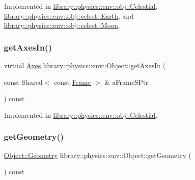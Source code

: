 Implemented in \hyperlink{classlibrary_1_1physics_1_1env_1_1obj_1_1_celestial_aaf8aa41a0ff9336eba62c07e3c27f82d}{library\+::physics\+::env\+::obj\+::\+Celestial}, \hyperlink{classlibrary_1_1physics_1_1env_1_1obj_1_1celest_1_1_earth_aca39bec00a2046a3fcef9bf22be52428}{library\+::physics\+::env\+::obj\+::celest\+::\+Earth}, and \hyperlink{classlibrary_1_1physics_1_1env_1_1obj_1_1celest_1_1_moon_a9d922ab338809a6c1052edbe11ce3e60}{library\+::physics\+::env\+::obj\+::celest\+::\+Moon}.

\mbox{\label{classlibrary_1_1physics_1_1env_1_1_object_a6807199a92fd78c10c6327b9ca654f50}} 
\subsubsection{\texorpdfstring{get\+Axes\+In()}{getAxesIn()}}
{\footnotesize\ttfamily virtual \hyperlink{classlibrary_1_1physics_1_1coord_1_1_axes}{Axes} library\+::physics\+::env\+::\+Object\+::get\+Axes\+In (\begin{DoxyParamCaption}\item[{const Shared$<$ const \hyperlink{classlibrary_1_1physics_1_1coord_1_1_frame}{Frame} $>$ \&}]{a\+Frame\+S\+Ptr }\end{DoxyParamCaption}) const\hspace{0.3cm}{\ttfamily [pure virtual]}}



Implemented in \hyperlink{classlibrary_1_1physics_1_1env_1_1obj_1_1_celestial_a51d7ed3c0dcf627fbbcd81f9b190fb6b}{library\+::physics\+::env\+::obj\+::\+Celestial}.

\mbox{\label{classlibrary_1_1physics_1_1env_1_1_object_a504f76c6e6da18b531972e6f26329255}} 
\subsubsection{\texorpdfstring{get\+Geometry()}{getGeometry()}}
{\footnotesize\ttfamily \hyperlink{classlibrary_1_1physics_1_1env_1_1_object_abdf50733c7ad97327fb64edca5670f13}{Object\+::\+Geometry} library\+::physics\+::env\+::\+Object\+::get\+Geometry (\begin{DoxyParamCaption}{ }\end{DoxyParamCaption}) const}

